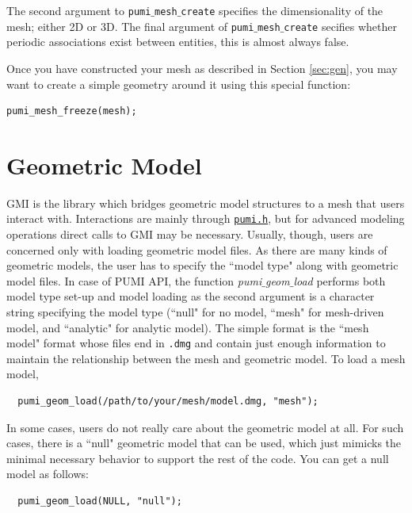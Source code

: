 \documentclass{article}
\begin{document}
The second argument to \texttt{pumi$\_$mesh$\_$create}
specifies the dimensionality of the mesh; either 2D or 3D.
The final argument of \texttt{pumi$\_$mesh$\_$create} secifies
whether periodic associations exist between entities, this is
almost always false.

Once you have constructed your mesh as described in Section \ref{sec:gen},
you may want to create a simple geometry around it using
this special function:

\begin{lstlisting}
pumi_mesh_freeze(mesh);
\end{lstlisting}

\section{Geometric Model}
\label{sec:gmi}

GMI is the library which bridges geometric model structures
to a mesh that users interact with.
Interactions are mainly through
\href{https://github.com/SCOREC/core/blob/master/pumi/pumi.h}{\texttt{pumi.h}},
but for advanced modeling operations direct calls to GMI may be necessary.
Usually, though, users are concerned only with loading geometric model files.
As there are many kinds of geometric models, the user has to specify the
``model type" along with geometric model files.
In case of PUMI API, the function \emph{pumi$\_$geom$\_$load} performs both
model type set-up and model loading as the second argument is a character
string specifying the model type (``null" for no model, ``mesh" for
mesh-driven model, and ``analytic" for analytic model).
The simple format is the ``mesh model" format whose files end in \texttt{.dmg}
and contain just enough information to maintain the relationship between the
mesh and geometric model.
To load a mesh model,

\begin{lstlisting}
  pumi_geom_load(/path/to/your/mesh/model.dmg, "mesh");
\end{lstlisting}

In some cases, users do not really care about the geometric model at
all.
For such cases, there is a ``null" geometric model that can be used,
which just mimicks the minimal necessary behavior to support
the rest of the code.
You can get a null model as follows:

\begin{lstlisting}
  pumi_geom_load(NULL, "null");
\end{lstlisting}
\end{document}
